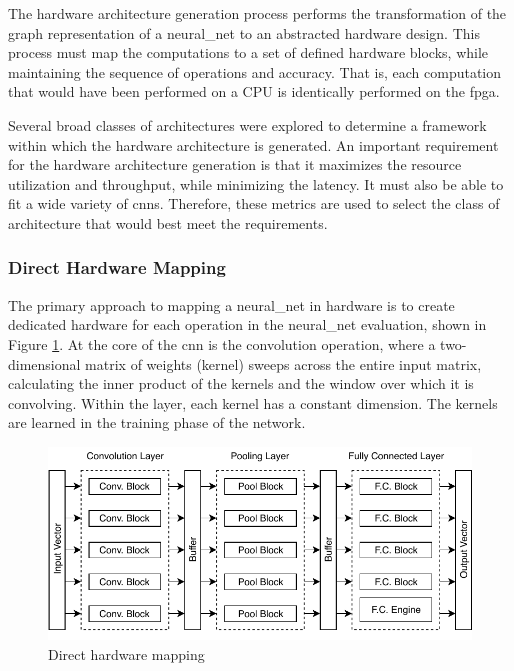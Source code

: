 \documentclass{uw-ece-wkrpt}
\begin{document}
The hardware architecture generation process performs the transformation of the graph representation of a \gls{neural_net} to an abstracted hardware design. This process must map the computations to a set of defined hardware blocks, while maintaining the sequence of operations and accuracy. That is, each computation that would have been performed on a CPU is identically performed on the \gls{fpga}.

Several broad classes of architectures were explored to determine a framework within which the hardware architecture is generated. An important requirement for the hardware architecture generation is that it maximizes the resource utilization and throughput, while minimizing the latency. It must also be able to fit a wide variety of \glspl{cnn}. Therefore, these metrics are used to select the class of architecture that would best meet the requirements.

\subsubsection{Direct Hardware Mapping}

The primary approach to mapping a \gls{neural_net} in hardware is to create dedicated hardware for each operation in the \gls{neural_net} evaluation, shown in Figure \ref{fig:direct_hardware_mapping}. At the core of the \gls{cnn} is the convolution operation, where a two-dimensional matrix of weights (\gls{kernel}) sweeps across the entire input matrix, calculating the inner product of the kernels and the window over which it is convolving. Within the layer, each \gls{kernel} has a constant dimension. The kernels are learned in the training phase of the network.

\begin{figure}
    \centering
    \includegraphics{figures/direct_hardware_mapping}
    \caption{Direct hardware mapping \cite{Abdelouahab2017Hardware-Automa}}\label{fig:direct_hardware_mapping}
\end{figure}
\end{document}
